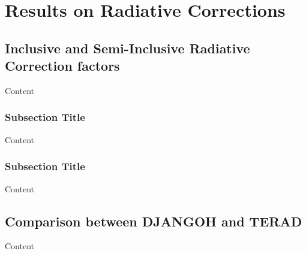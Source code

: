 
\chapter{Results on Radiative Corrections} %

\label{ch:RC} %


\section{Inclusive and Semi-Inclusive Radiative Correction factors}

Content


\subsection{Subsection Title}

Content


\subsection{Subsection Title}

Content


\section{Comparison between DJANGOH and TERAD}

Content
